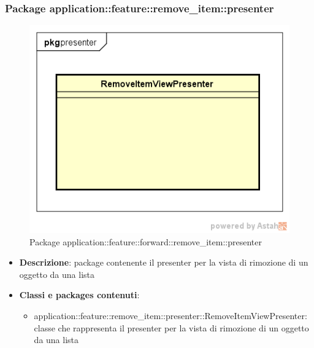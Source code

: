 \subsubsection{Package application::feature::remove\_item::presenter}
\label{Package application::feature::remove_item::presenter}
\begin{figure}[H]
	\centering
	\includegraphics[scale=0.5]{Sezioni/Packages/Application/remove_item_presenter.png}
	\caption{Package application::feature::forward::remove\_item::presenter}
\end{figure}
\begin{itemize}
	\item \textbf{Descrizione}: package contenente il presenter per la vista di rimozione di un oggetto da una lista
	\item \textbf{Classi e packages contenuti}:
	\begin{itemize}
	\item application::feature::remove\_item::presenter::RemoveItemViewPresenter: classe che rappresenta il presenter per la vista di rimozione di un oggetto da una lista
	\end{itemize}
\end{itemize}


